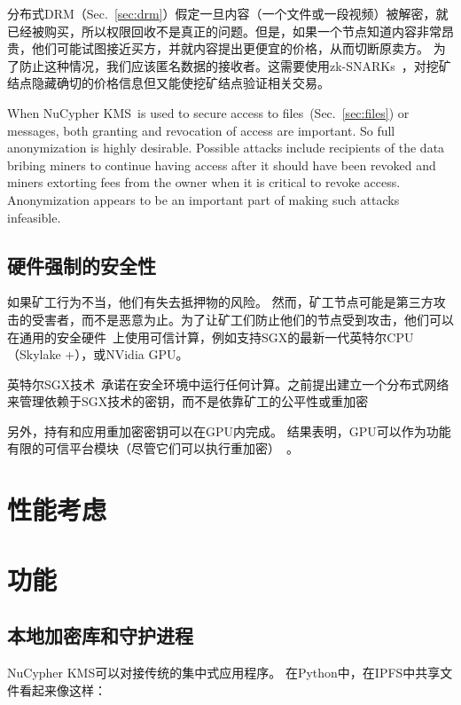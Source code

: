 \documentclass[longbibliography,nofootinbib]{revtex4-1}
\newcommand{\kms}{NuCypher KMS}
\begin{document}
\begin{CJK*}{UTF8}{gbsn}
    分布式DRM（Sec.~\ref{sec:drm}）假定一旦内容（一个文件或一段视频）被解密，就已经被购买，所以权限回收不是真正的问题。但是，如果一个节点知道内容非常昂贵，他们可能试图接近买方，并就内容提出更便宜的价格，从而切断原卖方。 为了防止这种情况，我们应该匿名数据的接收者。这需要使用zk-SNARKs~\cite{consensys-snarks}，对挖矿结点隐藏确切的价格信息但又能使挖矿结点验证相关交易。

When \kms~is used to secure access to files~(Sec.~\ref{sec:files}) or messages, both granting and revocation of access are important.
So full anonymization is highly desirable.
Possible attacks include recipients of the data bribing miners to continue having access after it should have been revoked and
miners extorting fees from the owner when it is critical to revoke access.
Anonymization appears to be an important part of making such attacks infeasible.

\subsection{硬件强制的安全性}

	如果矿工行为不当，他们有失去抵押物的风险。 然而，矿工节点可能是第三方攻击的受害者，而不是恶意为止。为了让矿工们防止他们的节点受到攻击，他们可以在通用的安全硬件~\cite{Yang2011}上使用可信计算，例如支持SGX的最新一代英特尔CPU（Skylake +），或NVidia GPU。
    
    英特尔SGX技术~\cite{wiki:sgx}承诺在安全环境中运行任何计算。之前提出建立一个分布式网络来管理依赖于SGX技术的密钥，而不是依靠矿工的公平性或重加密~\cite{sgx-blockchain-encryption}
    
    另外，持有和应用重加密密钥可以在GPU内完成。 结果表明，GPU可以作为功能有限的可信平台模块（尽管它们可以执行重加密）~\cite{gpu-trusted}。


\section{性能考虑}

\section{功能}

\subsection{本地加密库和守护进程}

NuCypher KMS可以对接传统的集中式应用程序。 在Python中，在IPFS中共享文件看起来像这样：


\end{CJK*}
\end{document}
